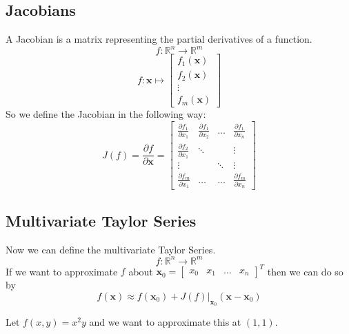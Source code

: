 \documentclass[11pt]{article}
\newcommand{\R}{\mathbb{R}}
\renewcommand{\vec}[1]{\mathbf{#1}}
\begin{document}
\subsection{Jacobians}
A Jacobian is a matrix representing the partial derivatives of a function.
$$f: \R^n \to \R^m$$
$$f: \vec{x} \mapsto \begin{bmatrix}
f_1(\vec{x})\\ f_2(\vec{x}) \\ \vdots \\ f_m(\vec{x})
\end{bmatrix}$$
So we define the Jacobian in the following way:
$$J(f) = \frac{\partial f}{\partial \vec{x}} = \begin{bmatrix}
\frac{\partial f_1}{\partial x_1} & \frac{\partial f_1}{\partial x_2} & \dots & \frac{\partial f_1}{\partial x_n}\\
\frac{\partial f_2}{\partial x_1} & \ddots & & \vdots\\
\vdots & & \ddots & \vdots\\
\frac{\partial f_m}{\partial x_1} & \dots & \dots & \frac{\partial f_m}{\partial x_n} 
\end{bmatrix}$$

\subsection{Multivariate Taylor Series}
Now we can define the multivariate Taylor Series.
$$f: \R^n \to \R^m$$
If we want to approximate $f$ about $\vec{x}_0 = \begin{bmatrix}
x_0 & x_1 &\dots & x_n
\end{bmatrix}^T$ then we can do so by
$$f(\vec{x}) \approx f(\vec{x}_0) + \left.J(f)\right|_{\vec{x}_0}(\vec{x} - \vec{x}_0)$$

Let $f(x,y) = x^2y$ and we want to approximate this at $(1,1)$.
\begin{center}
\end{center}
\end{document}

